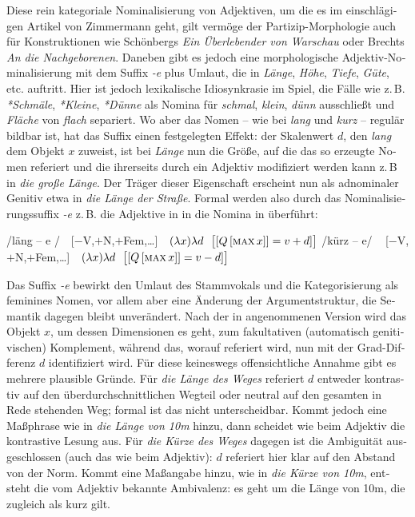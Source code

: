 \documentclass[output=paper,colorlinks,citecolor=brown]{langscibook}
\begin{document}
\begin{otherlanguage}{german}
Diese rein kategoriale Nominalisierung von Adjektiven, um die es im einschlägigen Artikel von Zimmermann geht, gilt vermöge der Partizip-Morphologie auch für Konstruktionen wie Schönbergs \textit{Ein Über\-lebender von Warschau} oder Brechts \textit{An die Nachgeborenen}. Daneben gibt es jedoch eine morpho\-logische Ad\-jek\-tiv-No\-mi\-na\-li\-sierung mit dem Suffix \textit{-e} plus Umlaut, die in \textit{Länge}, \textit{Höhe}, \textit{Tiefe}, \textit{Güte}, etc. auftritt. Hier ist jedoch lexikalische Idiosynkrasie im Spiel, die Fälle wie z.\,B. \textit{*Schmäle}, \textit{*Kleine}, \textit{*Dünne} als Nomina für \textit{schmal}, \textit{klein}, \textit{dünn} ausschließt und \textit{Fläche} von \textit{flach} separiert. Wo aber das Nomen -- wie bei \textit{lang} und \textit{kurz} -- regulär bildbar ist, hat das Suffix einen festgelegten Effekt: der Skalenwert $d$, den \textit{lang} dem Objekt $x$ zuweist, ist bei \textit{Länge} nun die Größe, auf die das so erzeugte Nomen referiert und die ihrerseits durch ein Adjektiv modifiziert werden kann z.\,B in \textit{die große Länge}. Der Träger dieser Eigenschaft erscheint nun als adnominaler Genitiv etwa in \textit{die Länge der Straße}. Formal werden also durch das Nominalisierungs\-suffix \textit{-e} z.\,B. die Adjektive in  in die Nomina in  überführt:

\ea
\ea /läng -- e / \,\, [$-$V,$+$N,$+$Fem,\dots] \,\, $(\lambda x) \lambda d \,\,\,\, \big\lbrack [ Q\, [ \textsc{max}\, x ]] = v + d ]\big\rbrack$ 
\ex /kürz -- e/ \,\,\, [$-$V,$+$N,$+$Fem,\dots] \,\, $(\lambda x) \lambda d \,\,\,\, \big\lbrack [ Q\, [ \textsc{max}\, x ]] = v - d ]\big\rbrack$
\z
\label{ex:22}
\z

\noindent Das Suffix \textit{-e} bewirkt den Umlaut des Stammvokals und die Kategorisierung als feminines Nomen, vor allem aber eine Änderung der Argumentstruktur, die Semantik dagegen bleibt unverändert. Nach der in  angenommenen Version wird das Objekt $x$, um dessen Dimensionen es geht, zum fakultativen (automatisch genitivischen) Komplement, während das, worauf referiert wird, nun mit der Grad-Differenz $d$ identifiziert wird. Für diese keineswegs offensichtliche Annahme gibt es mehrere plausible Gründe. Für \textit{die Länge des Weges} referiert $d$ entweder kontrastiv auf den überdurchschnittlichen Wegteil oder neutral auf den gesamten in Rede stehenden Weg; formal ist das nicht unterscheidbar. Kommt jedoch eine Maßphrase wie in \textit{die Länge von 10m} hinzu, dann scheidet wie beim Adjektiv die kontrastive Lesung aus. Für \textit{die Kürze des Weges} dagegen ist die Ambiguität ausgeschlossen (auch das wie beim Adjektiv): $d$ referiert hier klar auf den Abstand von der Norm. Kommt eine Maßangabe hinzu, wie in \textit{die Kürze von 10m}, entsteht die vom Adjektiv bekannte Ambivalenz: es geht um die Länge von 10m, die zugleich als kurz gilt.


\end{otherlanguage}
\end{document}
